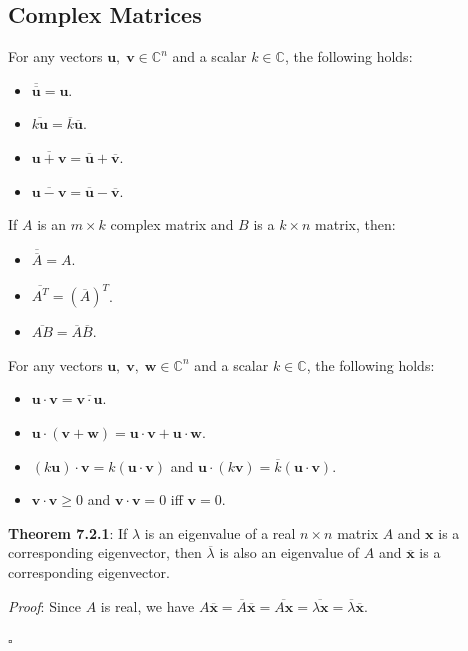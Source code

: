 \documentclass{article}
\newcommand{\separate}[1] {\vspace{#1 pt}\noindent}
\newcommand{\C}{\mathbb{C}}
\newcommand{\proof}[2]{\textit{Proof}: #2 \begin{flushright}\(\square\)\end{flushright}\label{prf:#1}}
\newcommand{\theorem}[3]{\textbf{Theorem #1}: #2 \par\separate{3}\proof{thm:#1}{#3}\label{thm:#1}}
\begin{document}
\subsection{Complex Matrices}

For any vectors \(\mathbf{u},\;\mathbf{v} \in \C^n\) and a scalar \(k \in \C\), the following holds:
\begin{itemize}
    \item \(\overline{\overline{\mathbf{u}}} = \mathbf{u}\).
    \item \(\overline{k\mathbf{u}} = \overline{k}\overline{\mathbf{u}}\).
    \item \(\overline{\mathbf{u} + \mathbf{v}} = \overline{\mathbf{u}} + \overline{\mathbf{v}}\).
    \item \(\overline{\mathbf{u} - \mathbf{v}} = \overline{\mathbf{u}} - \overline{\mathbf{v}}\).
\end{itemize}
If \(A\) is an \(m \times k\) complex matrix and \(B\) is a \(k \times n\) matrix, then:
\begin{itemize}
    \item \(\overline{\overline{A}} = A\).
    \item \(\overline{A^T} = (\overline{A})^T\).
    \item \(\overline{AB} = \overline{A}\overline{B}\).
\end{itemize}
For any vectors \(\mathbf{u},\;\mathbf{v},\;\mathbf{w} \in \C^n\) and a scalar \(k \in \C\), the following holds:
\begin{itemize}
    \item \(\mathbf{u} \cdot \mathbf{v} = \overline{\mathbf{v} \cdot \mathbf{u}}\).
    \item \(\mathbf{u} \cdot (\mathbf{v} + \mathbf{w}) = \mathbf{u} \cdot \mathbf{v} + \mathbf{u} \cdot \mathbf{w}\).
    \item \((k \mathbf{u}) \cdot \mathbf{v} = k(\mathbf{u} \cdot \mathbf{v})\) and \(\mathbf{u} \cdot (k \mathbf{v}) = \overline{k}(\mathbf{u} \cdot \mathbf{v})\).
    \item \(\mathbf{v} \cdot \mathbf{v} \geq 0\) and \(\mathbf{v} \cdot \mathbf{v} = 0\) iff \(\mathbf{v} = 0\).
\end{itemize}

\separate{7}\theorem{7.2.1}{If \(\lambda\) is an eigenvalue of a real \(n \times n\) matrix \(A\) and \(\mathbf{x}\) is a corresponding eigenvector, then \(\overline{\lambda}\) is also an eigenvalue of \(A\) and \(\overline{\mathbf{x}}\) is a corresponding eigenvector.}
{Since \(A\) is real, we have \(A\overline{\mathbf{x}} = \overline{A}\overline{\mathbf{x}} = \overline{A\mathbf{x}} = \overline{\lambda\mathbf{x}} = \overline{\lambda}\overline{\mathbf{x}}\).}
\end{document}
